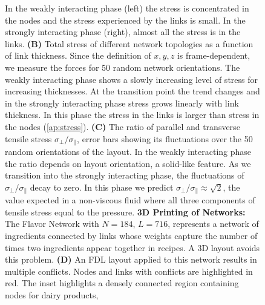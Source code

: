\documentclass[endfloats,nofootinbib,preprint,floatfix,titlepage,superscriptaddress,linenumbers]{revtex4-1} %
\begin{document}
\begin{figure}
{    %
    In the weakly interacting phase (left) the stress is concentrated in the nodes and the stress experienced by the links is small. 
    In the strongly interacting phase (right), almost all the stress is in the links.  
    {\bf (B)} Total stress of different network topologies as a function of link thickness. Since the definition of $x,y,z$ is frame-dependent, we measure the forces for 50 random network orientations. 
    The weakly interacting phase shows a slowly increasing level of stress for increasing thicknesses. %
    At the transition point the trend changes and in the strongly interacting phase stress grows linearly with link thickness. 
    In this phase the stress in the links is larger than stress in the nodes (\ref{ap:stress}). 
    {\bf (C)} The ratio of parallel and transverse tensile stress $\sigma_\perp/\sigma_\parallel$, error bars showing its fluctuations over the 50 random orientations of the layout. 
    In the weakly interacting phase the ratio depends on layout orientation,
    a solid-like feature.
    As we transition into the strongly interacting phase, the fluctuations of $\sigma_\perp/\sigma_\parallel$ decay to zero. 
    In this phase we predict $\sigma_\perp/\sigma_\parallel \approx \sqrt{2}$, 
    the value expected in a non-viscous fluid where all three components of tensile stress equal to the pressure.
    { 
    {\bf 3D Printing of Networks:}
    The Flavor Network with $N=184$, $L=716$, represents a network of ingredients connected by links whose weights capture the number of times two ingredients appear together in recipes. 
    A 3D layout avoids this problem. 
    {\bf (D)} An FDL layout applied to this network results in multiple conflicts.
    Nodes and links with conflicts are highlighted in red. 
    The inset highlights a densely connected region containing nodes for dairy products,
}}
\end{figure}
\end{document}
